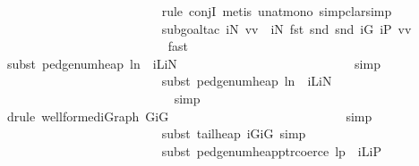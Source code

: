 \begin{isabellebody}
\ \ \ \ \ \ \ \ \ \ \ \ \ \ \ \ \ \ \ \ \ \ \ \ \isamarkupfalse%
\ {\isacharparenleft}rule\ conjI{\isacharcomma}\ metis\ unat{\isacharunderscore}mono{\isacharcomma}\ simp{\isacharcomma}clarsimp{\isacharparenright}\isanewline
\ \ \ \ \ \ \ \ \ \ \ \ \ \ \ \ \ \ \ \ \ \ \ \ \isamarkupfalse%
\ {\isacharparenleft}subgoal{\isacharunderscore}tac\ {\isachardoublequoteopen}iN\ vv\ {\isasymnoteq}\ iN\ {\isacharparenleft}fst\ {\isacharparenleft}snd\ {\isacharparenleft}snd\ iG{\isacharparenright}\ {\isacharparenleft}iP\ vv{\isacharparenright}{\isacharparenright}{\isacharparenright}\ {\isacharplus}\ {}{\isachardoublequoteclose}{\isacharparenright}\isanewline
\ \ \ \ \ \ \ \ \ \ \ \ \ \ \ \ \ \ \ \ \ \ \ \ \ \isamarkupfalse%
\ fast\isanewline
\ \ \ \ \ \ \ \ \ \ \ \ \ \ \ \ \ \ \ \ \ \ \ \ \isamarkupfalse%
\ {\isacharparenleft}subst\ pedge{\isacharunderscore}num{\isacharunderscore}heap{\isacharbrackleft}\ l{\isacharequal}n\ \ iL{\isacharequal}iN{\isacharbrackright}{\isacharparenright}\isanewline
\ \ \ \ \ \ \ \ \ \ \ \ \ \ \ \ \ \ \ \ \ \ \ \ \ \ \isamarkupfalse%
\ simp{\isacharplus}\isanewline
\ \ \ \ \ \ \ \ \ \ \ \ \ \ \ \ \ \ \ \ \ \ \ \ \isamarkupfalse%
\ {\isacharparenleft}subst\ pedge{\isacharunderscore}num{\isacharunderscore}heap{\isacharbrackleft}\ l{\isacharequal}n\ \ iL{\isacharequal}iN{\isacharbrackright}{\isacharparenright}\isanewline
\ \ \ \ \ \ \ \ \ \ \ \ \ \ \ \ \ \ \ \ \ \ \ \ \ \ \isamarkupfalse%
\ simp\isanewline
\ \ \ \ \ \ \ \ \ \ \ \ \ \ \ \ \ \ \ \ \ \ \ \ \ \isamarkupfalse%
\ {\isacharparenleft}drule\ wellformed{\isacharunderscore}iGraph{\isacharbrackleft}\ G{\isacharequal}iG{\isacharbrackright}{\isacharparenright}\isanewline
\ \ \ \ \ \ \ \ \ \ \ \ \ \ \ \ \ \ \ \ \ \ \ \ \ \ \isamarkupfalse%
\ simp{\isacharplus}\isanewline
\ \ \ \ \ \ \ \ \ \ \ \ \ \ \ \ \ \ \ \ \ \ \ \ \isamarkupfalse%
\ {\isacharparenleft}subst\ tail{\isacharunderscore}heap{\isacharbrackleft}\ iG{\isacharequal}iG{\isacharbrackright}{\isacharcomma}\ simp{\isacharplus}{\isacharparenright}\ \isanewline
\ \ \ \ \ \ \ \ \ \ \ \ \ \ \ \ \ \ \ \ \ \ \ \ \isamarkupfalse%
\ {\isacharparenleft}subst\ pedge{\isacharunderscore}num{\isacharunderscore}heap{\isacharunderscore}ptr{\isacharunderscore}coerce{\isacharbrackleft}\ l{\isacharequal}p\ \ iL{\isacharequal}iP{\isacharbrackright}{\isacharparenright}\isanewline

\end{isabellebody}
